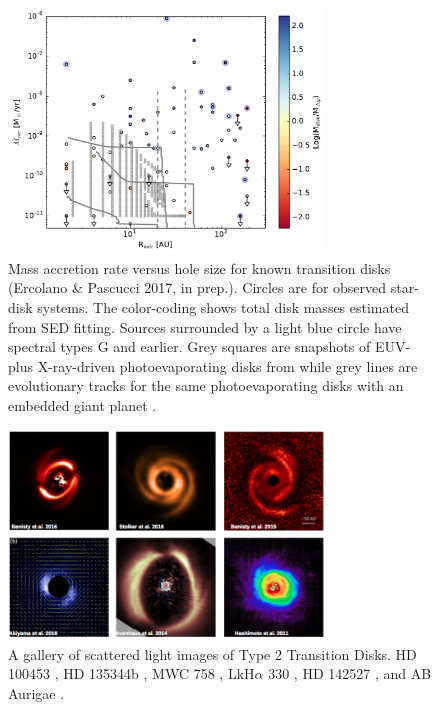 \documentclass[10pt,fleqn,twoside]{article}
\begin{document}
\begin{figure}
\centerline{\includegraphics[width=0.75\textwidth]{figures/Macc_Rhole_Mdisk.pdf}}
\caption{\label{fig-macc-rhole-mdisc}
  Mass accretion rate versus hole size for known transition
  disks (Ercolano \& Pascucci 2017, in prep.). Circles are for
  observed star-disk systems. The color-coding shows total disk masses
  estimated from SED fitting. Sources surrounded by a
  light blue circle have spectral types G and earlier. Grey squares
  are snapshots of EUV- plus X-ray-driven photoevaporating disks from
  \citet{2011MNRAS.412...13O} while grey lines are evolutionary tracks for the
  same photoevaporating disks with an embedded giant planet 
  \citep{2013MNRAS.430.1392R}.} 
\end{figure}


\begin{figure}
\centerline{\includegraphics[width=0.75\textwidth]{figures/Type2TD_Scat.png}}
\caption{\label{fig-type2-scat}
  A gallery of scattered light images of Type 2 Transition Disks. 
 HD 100453 
\citep{2017A&A...597A..42B}, HD 135344b \citep{2016A&A...595A.113S},
MWC 758 \citep{2015A&A...578L...6B}, LkH$\alpha$ 330 \citep{2016AJ....152..222A}, 
HD 142527 \citep{2014ApJ...781...87A}, and AB Aurigae \citep{2011ApJ...729L..17H}.} 
\end{figure}
\end{document}
